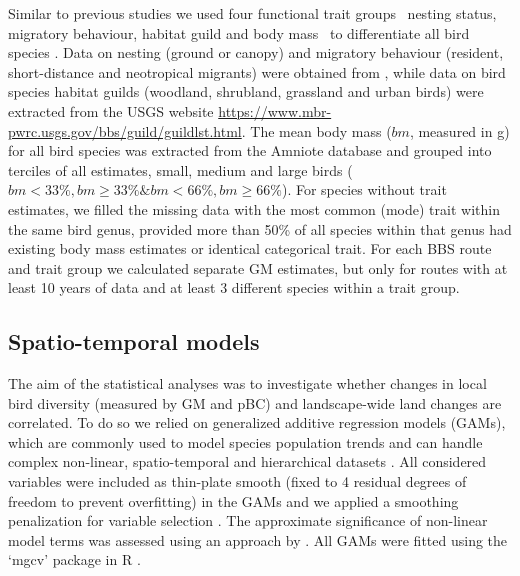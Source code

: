 Similar to previous studies we used four functional trait groups \textendash\ nesting status, migratory behaviour, habitat guild and body mass \textendash\ to differentiate all bird species \citep{Schipper2016,Barnagaud2017}. Data on nesting (ground or canopy) and migratory behaviour (resident, short-distance and neotropical migrants) were obtained from \cite{Albright2011}, while data on bird species habitat guilds (\eg woodland, shrubland, grassland and urban birds) were extracted from the USGS website \href{https://www.mbr-pwrc.usgs.gov/bbs/guild/guildlst.html}{https://www.mbr-pwrc.usgs.gov/bbs/guild/guildlst.html}. The mean body mass ($bm$, measured in g) for all bird species was extracted from the Amniote database \citep{Myhrvold2015} and grouped into terciles of all estimates, \eg small, medium and large birds ($bm < 33\%, bm \geq 33\% \& bm < 66\%, bm \geq 66\%$). For species without trait estimates, we filled the missing data with the most common (mode) trait within the same bird genus, provided more than 50\% of all species within that genus had existing body mass estimates or identical categorical trait. For each BBS route and trait group we calculated separate GM estimates, but only for routes with at least 10 years of data and at least 3 different species within a trait group.

\subsection{Spatio-temporal models}
\label{C05_0205}

The aim of the statistical analyses was to investigate whether changes in local bird diversity (measured by GM and pBC) and landscape-wide land changes are correlated. To do so we relied on generalized additive regression models (GAMs), which are commonly used to model species population trends \citep{Fewster2000} and can handle complex non-linear, spatio-temporal and hierarchical datasets \citep{Kneib2009,Wood2011}. All considered variables were included as thin-plate smooth (fixed to 4 residual degrees of freedom to prevent overfitting) in the GAMs and we applied a smoothing penalization for variable selection \citep[mgcv parameter: select = TRUE]{Wood2008}. The approximate significance of non-linear model terms was assessed using an approach by \cite{Wood2013}. All GAMs were fitted using the ‘mgcv’ package \citep[ver. 1.8-24]{Wood2011} in R \citep[ver. 3.5.0]{RTeam2014}.


